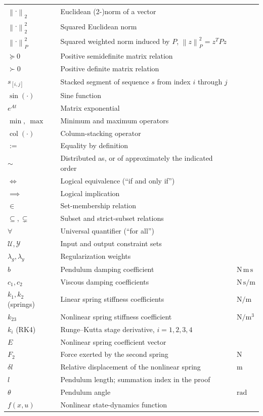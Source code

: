 \documentclass[12pt,a4paper]{report}
\newcommand{\norm}[1]{\left\lVert #1 \right\rVert}
\begin{document}
\begin{longtable}{@{}p{}p{}p{}@{}}
$\norm{\cdot}_2$ & Euclidean (2-)norm of a vector & \\
$\norm{\cdot}_2^2$ & Squared Euclidean norm & \\
$\norm{\cdot}_P^2$ & Squared weighted norm induced by $P$, $\norm{z}_P^2=z^TPz$ & \\
$\succeq 0$ & Positive semidefinite matrix relation & \\
$\succ 0$ & Positive definite matrix relation & \\
$s_{[i,j]}$ & Stacked segment of sequence $s$ from index $i$ through $j$ & \\
$\sin(\cdot)$ & Sine function & \\
$e^{A t}$ & Matrix exponential & \\
$\min,\ \max$ & Minimum and maximum operators & \\
$\operatorname{col}(\cdot)$ & Column-stacking operator & \\
$:=$ & Equality by definition & \\
$\sim$ & Distributed as, or of approximately the indicated order & \\
$\iff$ & Logical equivalence (``if and only if'') & \\
$\implies$ & Logical implication & \\
$\in$ & Set-membership relation & \\
$\subseteq, \subsetneq$ & Subset and strict-subset relations & \\
$\forall$ & Universal quantifier (``for all'') & \\
$\mathcal{U}, \mathcal{Y}$ & Input and output constraint sets & \\
$\lambda_g, \lambda_y$ & Regularization weights & \\
$b$ & Pendulum damping coefficient & $\mathrm{N\,m\,s}$ \\
$c_1, c_2$ & Viscous damping coefficients & $\mathrm{N\,s/m}$ \\
$k_1, k_2$ (springs) & Linear spring stiffness coefficients & $\mathrm{N/m}$ \\
$k_{23}$ & Nonlinear spring stiffness coefficient & $\mathrm{N/m^3}$ \\
$k_i$ (RK4) & Runge--Kutta stage derivative, $i=1,2,3,4$ & \\
$E$ & Nonlinear spring coefficient vector & \\
$F_2$ & Force exerted by the second spring & $\mathrm{N}$ \\
$\delta l$ & Relative displacement of the nonlinear spring & $\mathrm{m}$ \\
$l$ & Pendulum length; summation index in the proof & \\
$\theta$ & Pendulum angle & $\mathrm{rad}$ \\
$f(x,u)$ & Nonlinear state-dynamics function & \\
\bottomrule
\end{longtable}
\renewcommand{\arraystretch}{1}
\normalsize
\clearpage
\end{document}

